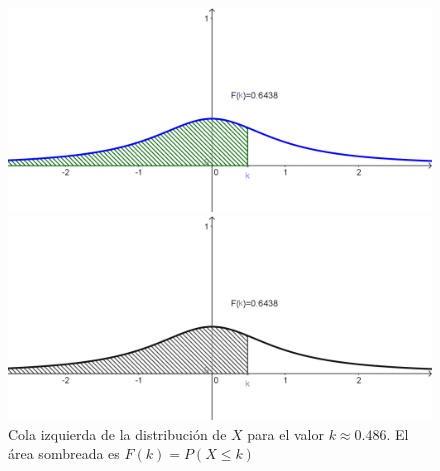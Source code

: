 \begin{ejemplo}
\begin{figure}[ht]
\begin{center}
\begin{enColor}
\includegraphics[width=12cm]{../fig/Cap05-DistribucionCauchy-ColaIzquierda.png}
\end{enColor}
\begin{bn}
\includegraphics[width=12cm]{../fig/Cap05-DistribucionCauchy-ColaIzquierda-bn.png}
\end{bn}
\caption{Cola izquierda de la distribución de $X$ para el valor $k\approx 0.486$. El área sombreada es $F(k)=P(X\leq k)$}
\label{cap05:fig:ColaIzquierdaDistribucion}
\end{center}
\end{figure}



\end{ejemplo}
